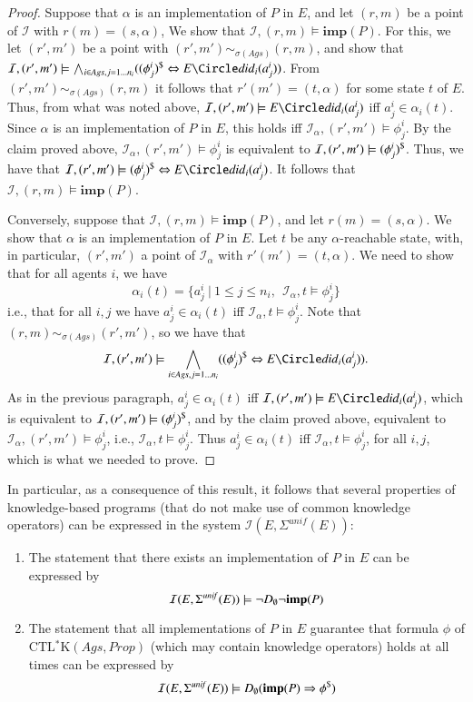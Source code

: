 \documentclass[a4wide]{article}
\newcommand{\CTLsK}{\mbox{CTL$^*$K}}
\newcommand{\Prop}{Prop}
\newcommand{\dimp}{\Leftrightarrow}
\theoremstyle{examplesty}
\newcommand{\strat}{\sigma}
\newcommand{\Ags}{\mathit{Ags}}
\newcommand{\I}{\mathcal{I}}
\newcommand{\rimp}{\Rightarrow}
\newcommand{\Env}{E}
\newcommand{\be}{\begin{enumerate}}
\newcommand{\ee}{\end{enumerate}}
\newcommand{\nxt}{\Circle}
\newcommand{\sgy}{\alpha}
\newcommand{\unif}{\mathit{unif}}
\newcommand{\Strat}{\Sigma}
\begin{document}
\begin{proof}
Suppose that $\alpha$ is an implementation of $P$ in $E$, and let $(r,m)$ be a point of $\I$ with $r(m) = (s,\alpha)$, 
We show that $\I,(r,m) \models \mathbf{imp}(P)$. For this, we let $(r',m')$ be a 
point with $(r',m') \sim_{\strat(\Ags)} (r,m)$, and show that 
$\I,(r',m') \models  \bigwedge_{i \in \Ags, j =1 \ldots n_i} ((\phi^i_j)^\$ \dimp  E\nxt \did_i(a^i_j))$.
From $(r',m') \sim_{\strat(\Ags)} (r,m)$ it follows that $r'(m') = (t,\alpha)$ for some state $t$ of $E$. 
Thus, from what was noted above, $\I,(r',m') \models E\nxt \did_i(a^i_j)$ iff $a^i_j \in \alpha_i(t)$. 
Since $\alpha$ is an implementation of $P$ in $E$, this holds iff 
$\I_\alpha,(r',m') \models \phi^i_j$. By the claim proved above, $\I_\alpha,(r',m') \models \phi^i_j$ is 
equivalent to $\I,(r',m') \models \trlk{(\phi^i_j)}$.
Thus, we have that  $\I,(r',m') \models \trlk{(\phi^i_j)} \dimp E\nxt \did_i(a^i_j)$. 
It follows that $\I,(r,m) \models \mathbf{imp}(P)$. 

Conversely, suppose that $\I,(r,m) \models \mathbf{imp}(P)$, and let $r(m) = (s,\alpha)$. 
We show that $\alpha$ is an implementation of $P$ in $E$. Let
$t$ be any $\alpha$-reachable state, with, in particular, $(r',m')$ a point of $\I_\alpha$ 
with $r'(m') = (t,\alpha)$. 
We need to show that for all agents $i$, we have 
$$ \sgy_i(t) = \{ a^i_j ~|~  1\leq j\leq n_i,~~\I_\sgy,t \models \phi^i_j\}$$
i.e., that for all $i,j$ we have $a^i_j \in \alpha_i(t)$ iff $\I_\sgy,t \models \phi^i_j$.
Note that $(r,m) \sim_{\strat(\Ags)} (r',m')$, so we have that 
$$\I,(r',m') \models  \bigwedge_{i \in \Ags, j =1 \ldots n_i} (\trlk{(\phi^i_j)} \dimp E\nxt \did_i(a^i_j)).$$
As in the previous paragraph, 
$a^i_j \in \alpha_i(t)$ iff $\I,(r',m') \models E\nxt \did_i(a^i_j)$, 
which is equivalent to  $\I,(r',m') \models \trlk{(\phi^i_j)}$, 
and by the claim proved above, equivalent to 
 $\I_\alpha,(r',m') \models \phi^i_j$, 
 i.e.,  $\I_\alpha,t \models \phi^i_j$. 
 Thus $a^i_j \in \alpha_i(t)$ iff $\I_\alpha,t \models \phi^i_j$, for all $i,j$, which is what we needed
 to prove.  
\end{proof} 

In particular, as  a consequence of this result, it follows that several properties 
of knowledge-based programs  (that do not make use of common knowledge operators)
can be expressed in the system 
$\I(E,\Strat^\unif(E))$: 
\be 
\item The statement that there exists an implementation of $P$ in $\Env$ can be expressed by 
$$ 
\I(E,\Strat^\unif(E))
\models \neg D_{\emptyset}\neg  {\bf imp}(P) $$ 
 \item The statement that  all implementations of $P$ in $\Env$ 
 guarantee that formula $\phi$ of $\CTLsK(\Ags, \Prop)$ (which may contain knowledge operators) holds at all times can be expressed 
 by $$  
\I(E,\Strat^\unif(E))
 \models D_{\emptyset}(  {\bf imp}(P) \rimp 
\phi^\$)$$ 
 \ee 
\end{document}
